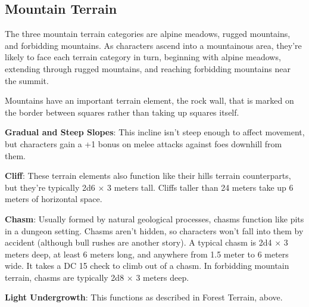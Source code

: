 \subsection{Mountain Terrain}
The three mountain terrain categories are alpine meadows, rugged mountains, and forbidding mountains. As characters ascend into a mountainous area, they're likely to face each terrain category in turn, beginning with alpine meadows, extending through rugged mountains, and reaching forbidding mountains near the summit.

Mountains have an important terrain element, the rock wall, that is marked on the border between squares rather than taking up squares itself.


\textbf{Gradual and Steep Slopes}: This incline isn't steep enough to affect movement, but characters gain a +1 bonus on melee attacks against foes downhill from them.

\textbf{Cliff}: These terrain elements also function like their hills terrain counterparts, but they're typically 2d6 $\times$ 3 meters tall. Cliffs taller than 24 meters take up 6 meters of horizontal space.

\textbf{Chasm}: Usually formed by natural geological processes, chasms function like pits in a dungeon setting. Chasms aren't hidden, so characters won't fall into them by accident (although bull rushes are another story). A typical chasm is 2d4 $\times$ 3 meters deep, at least 6 meters long, and anywhere from 1.5 meter to 6 meters wide. It takes a DC 15  check to climb out of a chasm. In forbidding mountain terrain, chasms are typically 2d8 $\times$ 3 meters deep.

\textbf{Light Undergrowth}: This functions as described in Forest Terrain, above.

